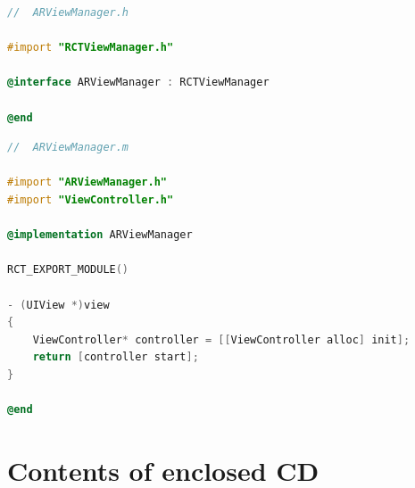 \documentclass[thesis=M,english]{FITthesis}[2012/10/20]
\begin{document}
\clearpage
\begin{lstlisting}[language=C]
//  ARViewManager.h

#import "RCTViewManager.h"

@interface ARViewManager : RCTViewManager

@end

\end{lstlisting}

\begin{lstlisting}[language=C]
//  ARViewManager.m

#import "ARViewManager.h"
#import "ViewController.h"

@implementation ARViewManager

RCT_EXPORT_MODULE()

- (UIView *)view
{
    ViewController* controller = [[ViewController alloc] init];
    return [controller start];
}

@end
\end{lstlisting}

\chapter{Contents of enclosed CD}


\begin{figure}
\end{figure}
\end{document}
